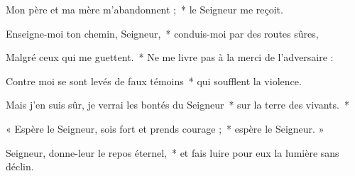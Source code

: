 \item Mon père et ma mère m'abandonnent ;~* le Seigneur me reçoit.

\item Enseigne-moi ton chemin, Seigneur,~* conduis-moi par des routes sûres,

\item Malgré ceux qui me guettent.~* Ne me livre pas à la merci de l'adversaire :

\item Contre moi se sont levés de faux témoins~* qui soufflent la violence.

\item Mais j'en suis sûr, je verrai les bontés du Seigneur~* sur la terre des vivants.~*

\item « Espère le Seigneur, sois fort et prends courage ;~* espère le Seigneur. »

\item Seigneur, donne-leur le repos éternel,~* et fais luire pour eux la lumière sans déclin.